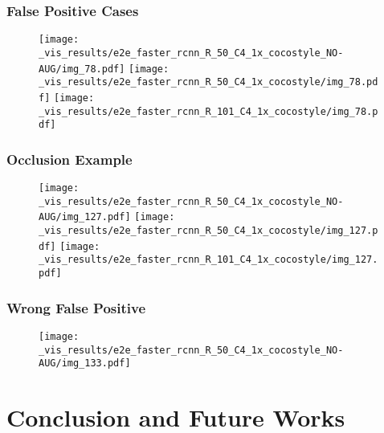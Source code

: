 \documentclass{beamer}
\begin{document}
		\begin{frame}\frametitle{False Positive Cases}
			\begin{figure}[htb!]
				\centering
				\texttt{[image: \_vis\_results/e2e\_faster\_rcnn\_R\_50\_C4\_1x\_cocostyle\_NO-AUG/img\_78.pdf]}
				\texttt{[image: \_vis\_results/e2e\_faster\_rcnn\_R\_50\_C4\_1x\_cocostyle/img\_78.pdf]}
				\vspace{.1mm}
				\texttt{[image: \_vis\_results/e2e\_faster\_rcnn\_R\_101\_C4\_1x\_cocostyle/img\_78.pdf]}
				\label{fig:FP_cases}
			\end{figure}
		\end{frame}


		\begin{frame}\frametitle{Occlusion Example}
			\begin{figure}[htb!]
				\centering
				\texttt{[image: \_vis\_results/e2e\_faster\_rcnn\_R\_50\_C4\_1x\_cocostyle\_NO-AUG/img\_127.pdf]}
				\texttt{[image: \_vis\_results/e2e\_faster\_rcnn\_R\_50\_C4\_1x\_cocostyle/img\_127.pdf]}
				\vspace{.1mm}
				\texttt{[image: \_vis\_results/e2e\_faster\_rcnn\_R\_101\_C4\_1x\_cocostyle/img\_127.pdf]}
  			\label{fig:occlusion}
			\end{figure}
		\end{frame}


		\begin{frame}\frametitle{Wrong False Positive}
			\begin{figure}[h!]
				\centering
				\texttt{[image: \_vis\_results/e2e\_faster\_rcnn\_R\_50\_C4\_1x\_cocostyle\_NO-AUG/img\_133.pdf]}
				\label{fig:wrong_fp}
			\end{figure}
		\end{frame}

	\section{Conclusion and Future Works}
\end{document}
